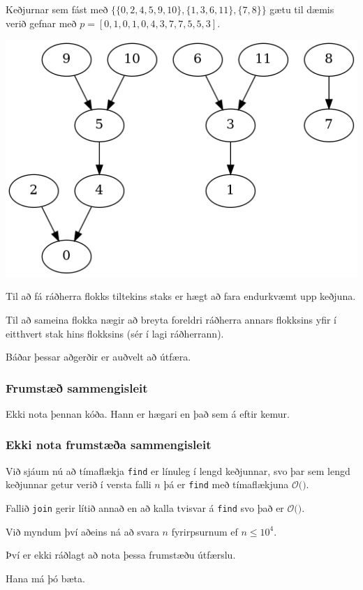 {
	{
		\item<1-> Keðjurnar sem fást með $\{\{0, 2, 4, 5, 9, 10\}, \{1, 3, 6, 11\}, \{7, 8\}\}$ gætu til dæmis verið gefnar með
					$p = [0, 1, 0, 1, 0, 4, 3, 7, 7, 5, 5, 3]$.
		\item<2->[] \includegraphics[scale=0.5]{fig/mynd.png}
	}
}

{
	{
		\item<1-> Til að fá ráðherra flokks tiltekins staks er hægt að fara endurkvæmt upp keðjuna.
		\item<2-> Til að sameina flokka nægir að breyta foreldri ráðherra annars flokksins yfir í
			eitthvert stak hins flokksins (sér í lagi ráðherrann).
		\item<3-> Báðar þessar aðgerðir er auðvelt að útfæra.
	}
}

{
	\frametitle{Frumstæð sammengisleit}
	{
		\item<0|handout:1> { Ekki nota þennan kóða. Hann er hægari en það sem á eftir kemur. }
	}
}

{
	\frametitle{Ekki nota frumstæða sammengisleit}
	{
		\item<1-> Við sjáum nú að tímaflækja \texttt{find} er línuleg í lengd keðjunnar, svo 
			þar sem lengd keðjunnar getur verið í versta falli $n$ þá er \texttt{find} með tímaflækjuna $\mathcal{O}($\onslide<2->{$\,n\,$}$)$.
		\item<3-> Fallið \texttt{join} gerir lítið annað en að kalla tvisvar á \texttt{find} svo það er $\mathcal{O}($\onslide<4->{$\,n\,$}$)$.
		\item<5-> Við myndum því aðeins ná að svara $n$ fyrirpsurnum ef $n \leq 10^4$.
		\item<6-> Því er ekki ráðlagt að nota þessa frumstæðu útfærslu.
		\item<7-> Hana má þó bæta.
	}
}

